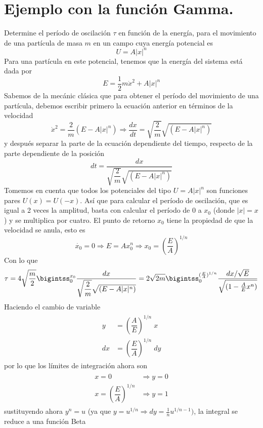 \section{Ejemplo con la función Gamma.}
Determine el período de oscilación $\tau$ en función de la energía, para el movimiento de una partícula de masa $m$ en un campo cuya energía potencial es
\[  U = A \vert x \vert^{n}  \]
Para una partícula en este potencial, tenemos que la energía del sistema está dada por
\[ E = \dfrac{1}{2} m \dot{x}^{2} +  A \vert x \vert^{n} \]
Sabemos de la mecánic clásica que para obtener el período del movimiento de una partícula, debemos escribir primero la ecuación anterior en términos de la velocidad
\[ \dot{x}^{2} = \dfrac{2}{m} \left( E - A \vert x \vert^{n} \right) \Rightarrow \dfrac{dx}{dt} =  \sqrt{\dfrac{2}{m}} \sqrt{\left( E - A \vert x \vert^{n} \right)} \]
y después separar la parte de la ecuación dependiente del tiempo, respecto de la parte dependiente de la posición
\[ dt = \dfrac{dx}{\sqrt{\dfrac{2}{m}} \sqrt{\left( E - A \vert x \vert^{n} \right)}} \]
Tomemos en cuenta que todos los potenciales del tipo $U = A \vert x \vert^{n}$ son funciones pares $U(x) =  U(-x)$. Así que para calcular el período de oscilación, que es igual a 2 veces la amplitud, basta con calcular el período de $0$ a $x_{0}$ (donde $\vert x \vert = x$) y se multiplica por cuatro. El punto de retorno $x_{0}$ tiene la propiedad de que la velocidad se anula, esto es
\[ \dot{x_{0}} = 0 \Rightarrow E = A x_{0}^{n} \Rightarrow x_{0} = \left( \dfrac{E}{A} \right)^{1/n} \]
Con lo que
\[ \tau =  4 \sqrt{\dfrac{m}{2}} \bigintss_{0}^{x_{0}} \dfrac{dx}{\sqrt{\dfrac{2}{m}} \sqrt{\left( E - A \vert x \vert^{n} \right)}} = 2 \sqrt{2m} \bigintss_{0}^{(\frac{E}{A})^{1/n}} \dfrac{dx / \sqrt{E}}{\sqrt{(1 - \frac{A}{E} x^{n})}} \]
Haciendo el cambio de variable
\begin{eqnarray}
\begin{aligned}
y &= \left( \dfrac{A}{E} \right)^{1/n} \; x \\
dx &= \left( \dfrac{E}{A} \right)^{1/n} \; dy
\end{aligned}
\end{eqnarray}
por lo que los límites de integración ahora son
\begin{eqnarray}
\begin{aligned}
x = 0 & \Rightarrow y = 0 \\
x = \left( \dfrac{E}{A} \right)^{1/n} & \Rightarrow y = 1
\end{aligned}
\end{eqnarray}
sustituyendo ahora $y^{n} = u$ (ya que $y = u^{1/n} \Rightarrow dy = \frac{1}{n} u^{1/n - 1})$, la integral se reduce a una función Beta
